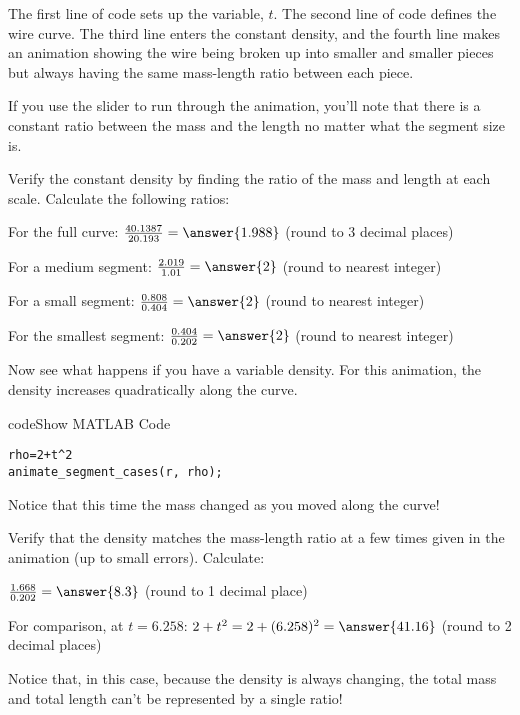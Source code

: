 \documentclass{ximera}
\begin{document}
The first line of code sets up the variable, $t$.  
The second line of code defines the wire curve. 
The third line enters the constant density, 
and the fourth line makes an animation showing the wire being broken up into smaller and smaller pieces but always having the same mass-length ratio between each piece.

If you use the slider to run through the animation, you'll note that there is a constant ratio between the mass and the length no matter what the segment size is.

\begin{problem}
Verify the constant density by finding the ratio of the mass and length at each scale. Calculate the following ratios:

For the full curve: $\frac{40.1387}{20.193} = \answer{1.988}$ (round to 3 decimal places)

For a medium segment: $\frac{2.019}{1.01} = \answer{2}$ (round to nearest integer)

For a small segment: $\frac{0.808}{0.404} = \answer{2}$ (round to nearest integer)

For the smallest segment: $\frac{0.404}{0.202} = \answer{2}$ (round to nearest integer)
\end{problem}

Now see what happens if you have a variable density. For this animation, the density increases quadratically along the curve.

\begin{expandable}{code}{Show MATLAB Code}
\begin{verbatim}
rho=2+t^2
animate_segment_cases(r, rho);
\end{verbatim}
\end{expandable}

Notice that this time the mass changed as you moved along the curve!

\begin{problem}
Verify that the density matches the mass-length ratio at a few times given in the animation (up to small errors). Calculate:

$\frac{1.668}{0.202} = \answer{8.3}$ (round to 1 decimal place)

For comparison, at $t = 6.258$: $2 + t^2 = 2 + (6.258)^2 = \answer{41.16}$ (round to 2 decimal places)
\end{problem}

Notice that, in this case, because the density is always changing, the total mass and total length can't be represented by a single ratio!
\end{document}
